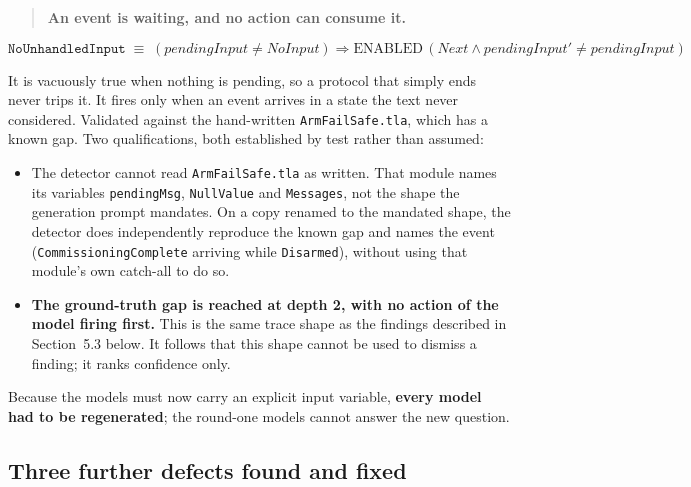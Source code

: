 \documentclass[11pt,a4paper]{article}
\begin{document}
\begin{quote}
\textbf{An event is waiting, and no action can consume it.}
\end{quote}

\[
\texttt{NoUnhandledInput} \;\equiv\; (\textit{pendingInput} \neq \textit{NoInput})
  \Rightarrow \mathrm{ENABLED}\,(\textit{Next} \wedge \textit{pendingInput}' \neq \textit{pendingInput})
\]

It is vacuously true when nothing is pending, so a protocol that simply ends never
trips it. It fires only when an event arrives in a state the text never considered.
Validated against the hand-written \texttt{ArmFailSafe.tla}, which has a known
gap. Two qualifications, both established by test rather than assumed:

\begin{itemize}
  \item The detector cannot read \texttt{ArmFailSafe.tla} as written. That module
    names its variables \texttt{pendingMsg}, \texttt{NullValue} and
    \texttt{Messages}, not the shape the generation prompt mandates. On a copy
    renamed to the mandated shape, the detector does independently reproduce the
    known gap and names the event (\texttt{CommissioningComplete} arriving while
    \texttt{Disarmed}), without using that module's own catch-all to do so.
  \item \textbf{The ground-truth gap is reached at depth 2, with no action of the
    model firing first.} This is the same trace shape as the findings described in
    Section~5.3 below. It follows that this shape cannot be used to dismiss a
    finding; it ranks confidence only.
\end{itemize}

Because the models must now carry an explicit input variable, \textbf{every model had
to be regenerated}; the round-one models cannot answer the new question.

\subsection{Three further defects found and fixed}
\end{document}
